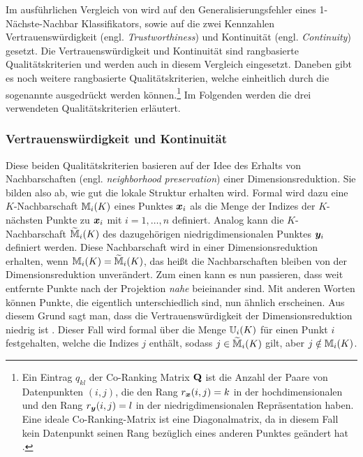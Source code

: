 Im ausführlichen Vergleich von \textcite{vanderMaaten.2009} wird auf den Generalisierungsfehler
eines 1-Nächste-Nachbar Klassifikators, sowie auf die zwei Kennzahlen Vertrauenswürdigkeit (engl.
\textit{Trustworthiness}) und Kontinuität (engl. \textit{Continuity}) \parencites{Venna.2001}{Venna.2006} gesetzt. Die Vertrauenswürdigkeit und Kontinuität sind rangbasierte
Qualitätskriterien und werden auch in diesem Vergleich eingesetzt. Daneben gibt es noch weitere
rangbasierte Qualitätskriterien, welche einheitlich durch die sogenannte
 \parencite[1432]{Lee.2009} ausgedrückt werden können.\footnote{ Ein Eintrag $q_{kl}$ der Co-Ranking
	Matrix $\mathbf{Q}$ ist die Anzahl der Paare von Datenpunkten $(i, j)$, die den Rang $r_{\bm{x}}(i,
		j) = k$ in der hochdimensionalen und den Rang $r_{\bm{y}}(i, j) = l$ in der niedrigdimensionalen
	Repräsentation haben. Eine ideale Co-Ranking-Matrix ist eine Diagonalmatrix, da in diesem Fall kein
	Datenpunkt seinen Rang bezüglich eines anderen Punktes geändert hat \parencite[1432]{Lee.2009}.} Im Folgenden werden die drei verwendeten Qualitätskriterien erläutert.


\subsubsection{Vertrauenswürdigkeit und Kontinuität}
\label{ch:Vergleich:sec:Methodik:subsec:Qualitaetskriterien:TC}
Diese beiden Qualitätskriterien basieren auf der Idee des Erhalts von Nachbarschaften (engl.
\textit{neighborhood preservation}) einer Dimensionsreduktion. Sie bilden also ab, wie gut die
lokale Struktur erhalten wird. Formal wird dazu eine $K$-Nachbarschaft $\mathbb{M}_i(K)$ eines Punktes $\bm{x}_i$ als die Menge der Indizes der $K$-nächsten Punkte zu $\bm{x}_i$ mit $i = 1, \ldots, n$ definiert.
Analog kann die $K$-Nachbarschaft $\widetilde{\mathbb{M}}_i(K)$ des dazugehörigen niedrigdimensionalen
Punktes $\bm{y}_i$ definiert werden. Diese Nachbarschaft wird in einer Dimensionsreduktion
erhalten, wenn $\mathbb{M}_i(K) = \widetilde{\mathbb{M}}_i(K)$, das heißt die Nachbarschaften bleiben von
der Dimensionsreduktion unverändert. Zum einen kann es nun passieren, dass weit entfernte Punkte nach der Projektion \textit{nahe}
beieinander sind. Mit anderen Worten können Punkte, die eigentlich unterschiedlich sind, nun
ähnlich erscheinen. Aus diesem Grund sagt man, dass die Vertrauenswürdigkeit der
Dimensionsreduktion niedrig ist \parencite[486 -- 487]{Venna.2001}. Dieser Fall wird formal über die Menge $\mathbb{U}_i(K)$ für einen
Punkt $i$ festgehalten, welche die Indizes $j$ enthält, sodass $j \in \widetilde{\mathbb{M}}_i(K)$
gilt, aber $j \notin \mathbb{M}_i(K)$.

